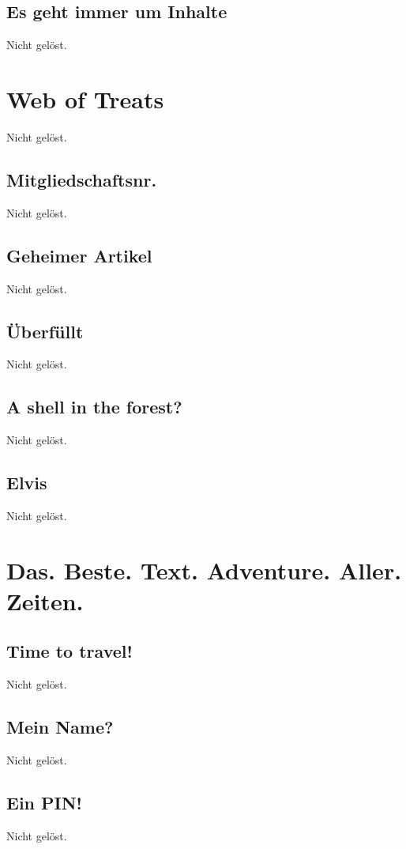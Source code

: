 \documentclass[12pt,a4paper,titlepage,oneside]{scrartcl}
\begin{document}
\subsection{Es geht immer um Inhalte}
Nicht gelöst.


\section{Web of Treats}
Nicht gelöst.

\subsection{Mitgliedschaftsnr.}
Nicht gelöst.

\subsection{Geheimer Artikel}
Nicht gelöst.

\subsection{\"Uberf\"ullt}
Nicht gelöst.

\subsection{A shell in the forest?}
Nicht gelöst.

\subsection{Elvis}
Nicht gelöst.


\section{Das. Beste. Text. Adventure. Aller. Zeiten.}

\subsection{Time to travel!}
Nicht gelöst.

\subsection{Mein Name?}
Nicht gelöst.

\subsection{Ein PIN!}
Nicht gelöst.
\end{document}
